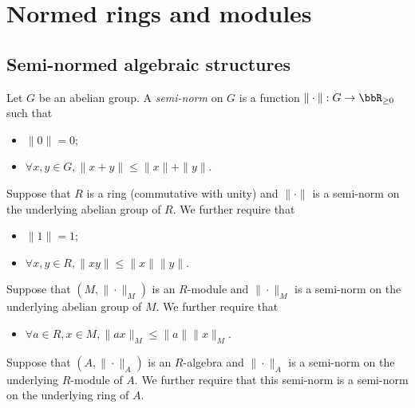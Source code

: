 \section{Normed rings and modules}

\subsection{Semi-normed algebraic structures}

    \begin{definition}\label{def:semi-normed_abelian_group_rings_modules_and_algebras}
        Let \(G\) be an abelian group.
        A \emph{semi-norm} on \(G\) is a function \(\|\cdot\|: G \to \bbR_{\geq 0}\) such that
        \begin{itemize}
            \item \(\|0\| = 0\);
            \item \(\forall x,y \in G, \|x + y\| \leq \|x\| + \|y\|\).
        \end{itemize}
        Suppose that \(R\) is a ring (commutative with unity) and \(\|\cdot\|\) is a semi-norm on the underlying abelian group of \(R\).
        We further require that
        \begin{itemize}
            \item \(\|1\| = 1\);
            \item \(\forall x,y \in R, \|xy\| \leq \|x\|\|y\|\).
        \end{itemize}
        Suppose that \((M,\|\cdot\|_M)\) is an \(R\)-module and \(\|\cdot\|_M\) is a semi-norm on the underlying abelian group of \(M\).
        We further require that 
        \begin{itemize}
            \item \(\forall a \in R, x \in M, \|ax\|_M \leq \|a\| \|x\|_M\).
        \end{itemize}
        Suppose that \((A, \|\cdot\|_A)\) is an \(R\)-algebra and \(\|\cdot\|_A\) is a semi-norm on the underlying \(R\)-module of \(A\).
        We further require that this semi-norm is a semi-norm on the underlying ring of \(A\).
    \end{definition}

